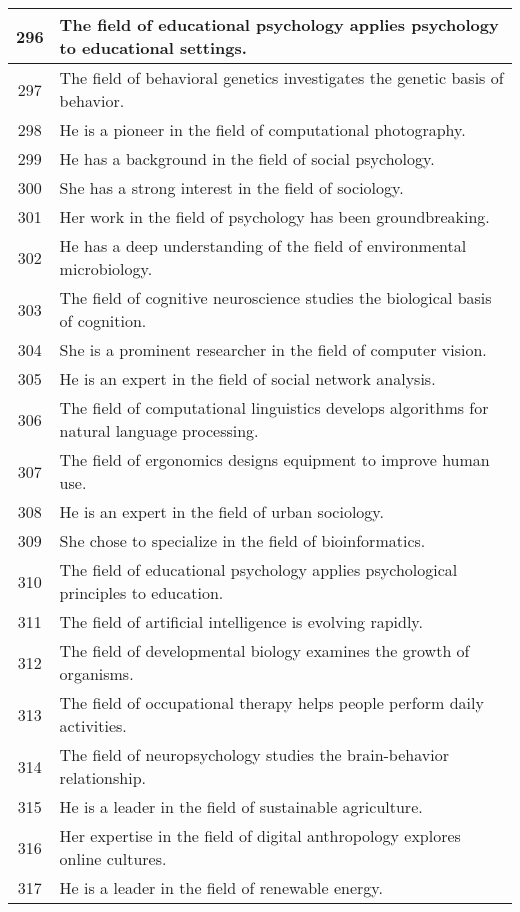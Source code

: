 \begin{longtable}{|c|p{12cm}|}
296 & The field of educational psychology applies psychology to educational settings. \\ \hline
297 & The field of behavioral genetics investigates the genetic basis of behavior. \\ \hline
298 & He is a pioneer in the field of computational photography. \\ \hline
299 & He has a background in the field of social psychology. \\ \hline
300 & She has a strong interest in the field of sociology. \\ \hline
301 & Her work in the field of psychology has been groundbreaking. \\ \hline
302 & He has a deep understanding of the field of environmental microbiology. \\ \hline
303 & The field of cognitive neuroscience studies the biological basis of cognition. \\ \hline
304 & She is a prominent researcher in the field of computer vision. \\ \hline
305 & He is an expert in the field of social network analysis. \\ \hline
306 & The field of computational linguistics develops algorithms for natural language processing. \\ \hline
307 & The field of ergonomics designs equipment to improve human use. \\ \hline
308 & He is an expert in the field of urban sociology. \\ \hline
309 & She chose to specialize in the field of bioinformatics. \\ \hline
310 & The field of educational psychology applies psychological principles to education. \\ \hline
311 & The field of artificial intelligence is evolving rapidly. \\ \hline
312 & The field of developmental biology examines the growth of organisms. \\ \hline
313 & The field of occupational therapy helps people perform daily activities. \\ \hline
314 & The field of neuropsychology studies the brain-behavior relationship. \\ \hline
315 & He is a leader in the field of sustainable agriculture. \\ \hline
316 & Her expertise in the field of digital anthropology explores online cultures. \\ \hline
317 & He is a leader in the field of renewable energy. \\ \hline

\end{longtable}

